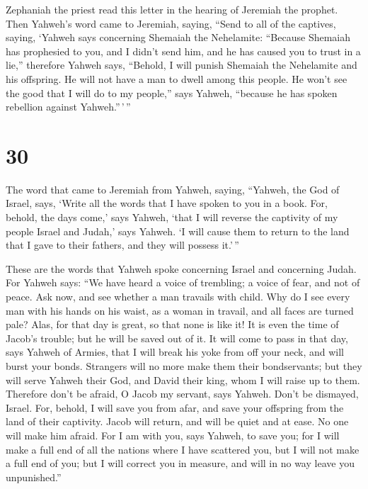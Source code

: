  Zephaniah the priest read this letter in the hearing of
Jeremiah the prophet.  Then Yahweh's word came to
Jeremiah, saying,  ``Send to all of the captives, saying,
`Yahweh says concerning Shemaiah the Nehelamite: ``Because Shemaiah has
prophesied to you, and I didn't send him, and he has caused you to trust
in a lie,''  therefore Yahweh says, ``Behold, I will
punish Shemaiah the Nehelamite and his offspring. He will not have a man
to dwell among this people. He won't see the good that I will do to my
people,'' says Yahweh, ``because he has spoken rebellion against
Yahweh.''\,'\,''

\hypertarget{section-29}{%
\section{30}\label{section-29}}

 The word that came to Jeremiah from Yahweh, saying,
 ``Yahweh, the God of Israel, says, `Write all the words
that I have spoken to you in a book.  For, behold, the
days come,' says Yahweh, `that I will reverse the captivity of my people
Israel and Judah,' says Yahweh. `I will cause them to return to the land
that I gave to their fathers, and they will possess it.'\,''

 These are the words that Yahweh spoke concerning Israel
and concerning Judah.  For Yahweh says: ``We have heard a
voice of trembling; a voice of fear, and not of peace. 
Ask now, and see whether a man travails with child. Why do I see every
man with his hands on his waist, as a woman in travail, and all faces
are turned pale?  Alas, for that day is great, so that
none is like it! It is even the time of Jacob's trouble; but he will be
saved out of it.  It will come to pass in that day, says
Yahweh of Armies, that I will break his yoke from off your neck, and
will burst your bonds. Strangers will no more make them their
bondservants;  but they will serve Yahweh their God, and
David their king, whom I will raise up to them. 
Therefore don't be afraid, O Jacob my servant, says Yahweh. Don't be
dismayed, Israel. For, behold, I will save you from afar, and save your
offspring from the land of their captivity. Jacob will return, and will
be quiet and at ease. No one will make him afraid.  For I
am with you, says Yahweh, to save you; for I will make a full end of all
the nations where I have scattered you, but I will not make a full end
of you; but I will correct you in measure, and will in no way leave you
unpunished.''

